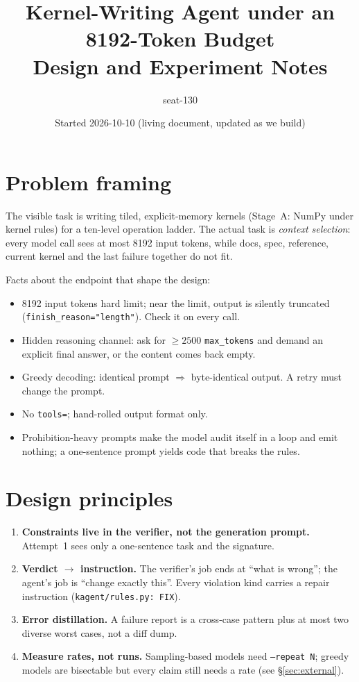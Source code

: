 \documentclass[11pt]{article}
\title{Kernel-Writing Agent under an 8192-Token Budget\\\large Design and Experiment Notes}
\author{seat-130}
\date{Started 2026-10-10 \quad (living document, updated as we build)}
\newcommand{\code}[1]{\texttt{#1}}
\begin{document}
\maketitle
\tableofcontents

\section{Problem framing}

The visible task is writing tiled, explicit-memory kernels (Stage~A: NumPy under kernel rules)
for a ten-level operation ladder. The actual task is \emph{context selection}: every model call
sees at most 8192 input tokens, while docs, spec, reference, current kernel and the last failure
together do not fit.

Facts about the endpoint that shape the design:
\begin{itemize}
  \item 8192 input tokens hard limit; near the limit, output is silently truncated
        (\code{finish\_reason="length"}). Check it on every call.
  \item Hidden reasoning channel: ask for $\geq 2500$ \code{max\_tokens} and demand an explicit
        final answer, or the content comes back empty.
  \item Greedy decoding: identical prompt $\Rightarrow$ byte-identical output. A retry must
        change the prompt.
  \item No \code{tools=}; hand-rolled output format only.
  \item Prohibition-heavy prompts make the model audit itself in a loop and emit nothing; a
        one-sentence prompt yields code that breaks the rules.
\end{itemize}

\section{Design principles}

\begin{enumerate}
  \item \textbf{Constraints live in the verifier, not the generation prompt.} Attempt~1 sees
        only a one-sentence task and the signature.
  \item \textbf{Verdict $\to$ instruction.} The verifier's job ends at ``what is wrong''; the
        agent's job is ``change exactly this''. Every violation kind carries a repair
        instruction (\code{kagent/rules.py: FIX}).
  \item \textbf{Error distillation.} A failure report is a cross-case pattern plus at most two
        diverse worst cases, not a diff dump.
  \item \textbf{Measure rates, not runs.} Sampling-based models need \code{--repeat N}; greedy
        models are bisectable but every claim still needs a rate (see \S\ref{sec:external}).
\end{enumerate}
\end{document}

